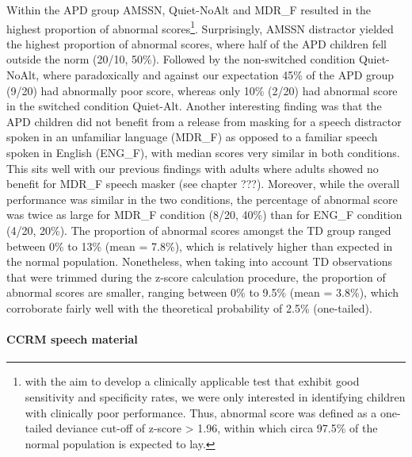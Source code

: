 \documentclass[a4paper, twoside]{templates/ociamthesis}
\begin{document}
Within the APD group AMSSN, Quiet-NoAlt and MDR\_F resulted in the highest proportion of abnormal scores\footnote{with the aim to develop a clinically applicable test that exhibit good sensitivity and specificity rates, we were only interested in identifying children with clinically poor performance. Thus, abnormal score was defined as a one-tailed deviance cut-off of z-score \textgreater{} 1.96, within which circa 97.5\% of the normal population is expected to lay.}. Surprisingly, AMSSN distractor yielded the highest proportion of abnormal scores, where half of the APD children fell outside the norm (20/10, 50\%). Followed by the non-switched condition Quiet-NoAlt, where paradoxically and against our expectation 45\% of the APD group (9/20) had abnormally poor score, whereas only 10\% (2/20) had abnormal score in the switched condition Quiet-Alt. Another interesting finding was that the APD children did not benefit from a release from masking for a speech distractor spoken in an unfamiliar language (MDR\_F) as opposed to a familiar speech spoken in English (ENG\_F), with median scores very similar in both conditions. This sits well with our previous findings with adults where adults showed no benefit for MDR\_F speech masker (see chapter ???). Moreover, while the overall performance was similar in the two conditions, the percentage of abnormal score was twice as large for MDR\_F condition (8/20, 40\%) than for ENG\_F condition (4/20, 20\%). The proportion of abnormal scores amongst the TD group ranged between 0\% to 13\% (mean = 7.8\%), which is relatively higher than expected in the normal population. Nonetheless, when taking into account TD observations that were trimmed during the z-score calculation procedure, the proportion of abnormal scores are smaller, ranging between 0\% to 9.5\% (mean = 3.8\%), which corroborate fairly well with the theoretical probability of 2.5\% (one-tailed).\\

\hypertarget{ccrm-speech-material}{%
\paragraph*{CCRM speech material}\label{ccrm-speech-material}}
\end{document}

